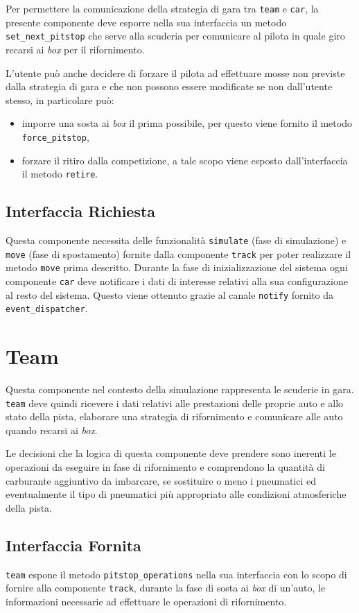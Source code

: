 \documentclass[a4paper]{report}
\newcommand{\fun}[1]{\texttt{#1}}
\begin{document}
Per permettere la comunicazione della strategia di gara tra \texttt{team} e \texttt{car}, la presente componente deve esporre nella sua interfaccia un metodo \fun{set\_next\_pitstop} che serve alla scuderia per comunicare al pilota in quale giro recarsi ai \textit{box} per il rifornimento.

L'utente può anche decidere di forzare il pilota ad effettuare mosse non previste dalla strategia di gara e che non possono essere modificate se non dall'utente stesso, in particolare può:
\begin{itemize}
\item imporre una sosta ai \textit{box} il prima possibile, per questo viene fornito il metodo \fun{force\_pitstop},
\item forzare il ritiro dalla competizione, a tale scopo viene esposto dall'interfaccia il metodo \fun{retire}.
\end{itemize}

\subsection*{Interfaccia Richiesta}
Questa componente necessita delle funzionalità \fun{simulate} (fase di simulazione) e \fun{move} (fase di spostamento) fornite dalla componente \texttt{track} per poter realizzare il metodo \fun{move} prima descritto.
Durante la fase di inizializzazione del sistema ogni componente \texttt{car} deve notificare i dati di interesse relativi alla sua configurazione al resto del sistema. Questo viene ottenuto grazie al canale \fun{notify} fornito da \texttt{event\_dispatcher}.

\section{Team}
Questa componente nel contesto della simulazione rappresenta le scuderie in gara. \texttt{team} deve quindi ricevere i dati relativi alle prestazioni delle proprie auto e allo stato della pista, elaborare una strategia di rifornimento e comunicare alle auto quando recarsi ai \textit{box}.

Le decisioni che la logica di questa componente deve prendere sono inerenti le operazioni da eseguire in fase di rifornimento e comprendono la quantità di carburante aggiuntivo da imbarcare, se sostituire o meno i pneumatici ed eventualmente il tipo di pneumatici più appropriato alle condizioni atmosferiche della pista.

\subsection*{Interfaccia Fornita}
\texttt{team} espone il metodo \fun{pitstop\_operations} nella sua interfaccia con lo scopo di fornire alla componente \texttt{track}, durante la fase di sosta ai \textit{box} di un'auto, le informazioni necessarie ad effettuare le operazioni di rifornimento.
\end{document}
